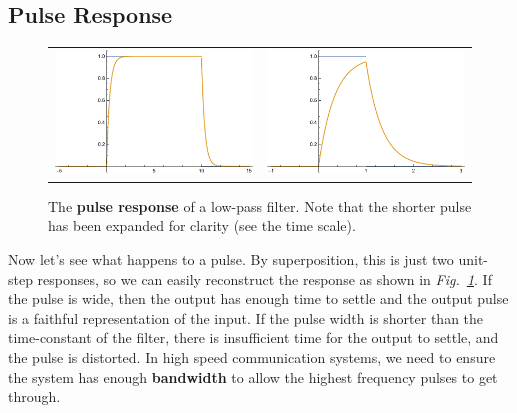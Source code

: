 \subsection{Pulse Response}
\begin{figure}[tb]
\centering
\begin{tabular}{cc}
\includegraphics[width=.4\columnwidth]{long_pulse.pdf} &
\includegraphics[width=.4\columnwidth]{fast_pulse.pdf} \\
\end{tabular}
\caption{The \textbf{pulse response} of a low-pass filter.  Note that the shorter pulse has been expanded for clarity (see the time scale). }
\label{fig:pulse_resp}
\end{figure}
Now let's see what happens to a pulse.  By superposition, this is just two unit-step responses, so we can easily reconstruct the response as shown in \emph{Fig.~\ref{fig:pulse_resp}}.  If the pulse is wide, then the output has enough time to settle and the output pulse is a faithful representation of the input.  If the pulse width is shorter than the time-constant of the filter, there is insufficient time for the output to settle, and the pulse is distorted.  In high speed communication systems, we need to ensure the system has enough \textbf{bandwidth} to allow the highest frequency pulses to get through.  
